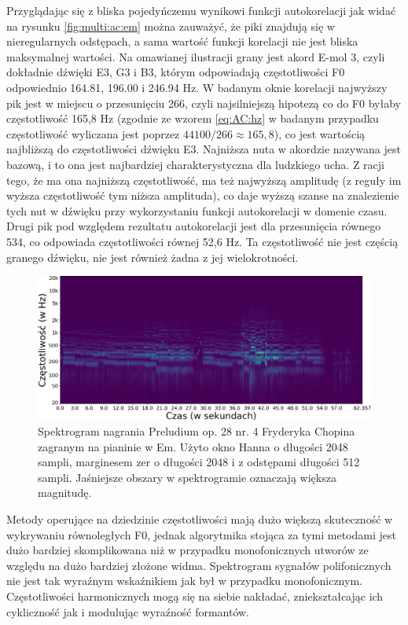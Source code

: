 \documentclass[12pt,a4paper,twoside]{mwart}
\begin{document}
Przyglądając się z bliska pojedyńczemu wynikowi funkcji autokorelacji jak widać na rysunku \ref{fig:multi:ac:em} można zauważyć, że piki znajdują się w nieregularnych odstępach, a sama wartość funkcji korelacji nie jest bliska maksymalnej wartości. Na omawianej ilustracji grany jest akord E-mol 3, czyli dokładnie dźwięki E3, G3 i B3, którym odpowiadają częstotliwości F0 odpowiednio 164.81, 196.00 i 246.94 Hz. W badanym oknie korelacji najwyższy pik jest w miejscu o przesunięciu 266, czyli najsilniejszą hipotezą co do F0 byłaby częstotliwość 165,8 Hz (zgodnie ze wzorem \ref{eq:AC:hz} w badanym przypadku częstotliwość wyliczana jest poprzez $44100 / 266 \approx 165,8$), co jest wartością najbliższą do częstotliwości dźwięku E3. Najniższa nuta w akordzie nazywana jest bazową, i to ona jest najbardziej charakterystyczna dla ludzkiego ucha. Z racji tego, że ma ona najniższą częstotliwość, ma też najwyższą amplitudę (z reguły im wyższa częstotliwość tym niższa amplituda), co daje wyższą szanse na znalezienie tych nut w dźwięku przy wykorzystaniu funkcji autokorelacji w domenie czasu. Drugi pik pod względem rezultatu autokorelacji jest dla przesunięcia równego 534, co odpowiada częstotliwości równej 52,6 Hz. Ta częstotliwość nie jest częścią granego dźwięku, nie jest również żadna z jej wielokrotności.

\begin{figure}[ht]
  \begin{center}
    \includegraphics[scale=0.38]{images/Spectrogram/spectrogram_multi_2048_512_cropped.png}
    \caption{Spektrogram nagrania Preludium op. 28 nr. 4 Fryderyka Chopina zagranym na pianinie w Em. Użyto okno Hanna o długości 2048 sampli, marginesem zer o długości 2048 i z odstępami długości 512 sampli. Jaśniejsze obszary w spektrogramie oznaczają większa magnitudę.}
    \label{fig:multi:spectrogram}
  \end{center}
\end{figure}

Metody operujące na dziedzinie częstotliwości mają dużo większą skuteczność w wykrywaniu równoległych F0, jednak algorytmika stojąca za tymi metodami jest dużo bardziej skomplikowana niż w przypadku monofonicznych utworów ze względu na dużo bardziej złożone widma. Spektrogram sygnałów polifonicznych nie jest tak wyraźnym wskaźnikiem jak był w przypadku monofonicznym. Częstotliwości harmonicznych mogą się na siebie nakładać, zniekształcając ich cykliczność jak i modulując wyraźność formantów.
\end{document}
